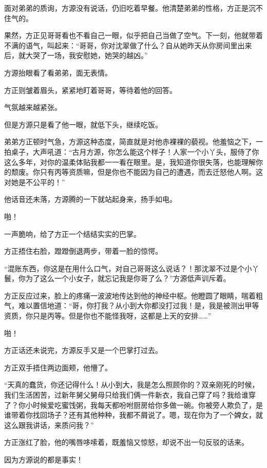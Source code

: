 
\begin{this_body}

面对弟弟的质询，方源没有说话，仍旧吃着早餐。他清楚弟弟的性格，方正是沉不住气的。

果然，方正见哥哥看也不看自己一眼，似乎把自己当做了空气。下一刻，他就带着不满的语气，叫起来：“哥哥，你对沈翠做了什么？自从她昨天从你房间里出来后，就大哭了一场，我安慰她，她哭的越凶。”

方源抬眼看了看弟弟，面无表情。

方正则皱着眉头，紧紧地盯着哥哥，等待着他的回答。

气氛越来越紧张。

但是方源只是看了他一眼，就低下头，继续吃饭。

弟弟方正顿时气急，方源这种态度，简直就是对他赤裸裸的藐视。他羞恼之下，一拍桌子，大声吼道：“古月方源，你怎么能这个样子！人家一个小丫头，服侍了你这么多年，对你的温柔体贴我都一一看在眼里。是，我知道你很失落，也能理解你的颓废。你只有丙等资质嘛，但是你也不能因为自己的遭遇，而去迁怒他人啊。这对她是不公平的！”

他话音还未落，方源腾的一下就站起身来，扬手如电。

啪！

一声脆响，给了方正一个结结实实的巴掌。

方正捂住右脸，蹬蹬倒退两步，带着一脸的惊愕。

“混账东西，你这是在用什么口气，对自己哥哥这么说话？！那沈翠不过是个小丫鬟，你为了这么一个小女子，就忘记我是你哥了么？”方源低声训斥着。

方正反应过来，脸上的疼痛一波波地传达到他的神经中枢。他瞪圆了眼睛，喘着粗气，难以置信地道：“哥，你打我？从小到大你都没打过我！是，我是被测出甲等资质，你只是丙等。但是你也不能怪我呀，这都是上天的安排……”

啪！

方正话还未说完，方源反手又是一个巴掌打过去。

方正双手捂住两边面颊，他懵了。

“天真的蠢货，你还记得什么！从小到大，我是怎么照顾你的？双亲刚死的时候，我们生活困苦，过新年舅父舅母只给我们俩一件新衣，我自己穿了吗？我给谁穿了？你小时候爱吃蜜饯粥，我每天都吩咐厨房给你多做一碗。你被旁人欺负了，是谁带着你找回场子？还有其他种种，我都不屑说了。嗯，现在你为了一个婢女，就这么跟我讲话，来质问我？”

方正涨红了脸，他的嘴唇哆嗦着，既羞恼又惊怒，却说不出一句反驳的话来。

因为方源说的都是事实！


\end{this_body}

